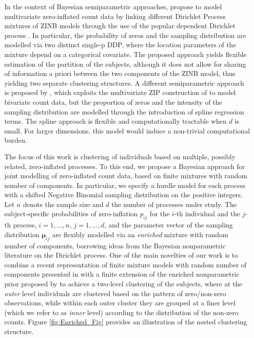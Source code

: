 \documentclass[11pt]{article}
\begin{document}
In the context of Bayesian semiparametric approaches, \cite{shuler2021bayesian} propose to model multivariate zero-inflated count data by linking different Dirichlet Process mixtures of ZINB models through the use of the popular dependent Dirichlet process \citep {maceachern1999dependent}. In particular, the probability of zeros and the sampling distribution are modelled via two distinct single-p DDP, where the location parameters of the mixture depend on a categorical covariate. The proposed approach yields flexible estimation of the partition of the subjects, although it does not allow for sharing of information a priori between the two components of the ZINB model, thus yielding two separate clustering structures. A different semiparametric approach is proposed by \citet{arab2012semiparametric}, which exploits the multivariate ZIP construction of \citet{li1999multivariate} to model bivariate count data, but  the proportion of zeros and the intensity of the sampling distribution are modelled through the introduction of spline regression terms. The spline approach is flexible and computationally tractable when $d$ is small. For larger dimensions, this model would induce a non-trivial computational burden.



The focus of this work is clustering of individuals based on multiple, possibly related, zero-inflated processes. To this end, we propose a Bayesian  approach for joint modelling of zero-inflated count data, based on finite mixtures with random number of components. In particular, we specify a hurdle model for each process with a shifted Negative Binomial sampling distribution on the positive integers. Let $n$ denote the sample size and $d$ the number of processes under study. The subject-specific probabilities of zero-inflation $p_{ij}$ for the $i$-th individual and the $j$-th process, $i=1,\ldots,n$, $j=1,\ldots,d$, and the parameter vector of the sampling distribution $\bm \mu_{ij}$ are flexibly modelled via an {\em enriched} mixture with random number of components, borrowing ideas from the Bayesian nonparametric literature on the Dirichlet process. One of the main novelties of our work is to combine a recent representation of finite mixture models with random number of components presented in \citet{Argiento2022} with a finite extension of the enriched nonparametric prior proposed by \citet{wade2011enriched} to achieve a two-level clustering of the subjects, where at the {\em outer} level individuals are clustered based on the pattern of zero/non-zero observations, while within each outer cluster they are grouped at a finer level (which we refer to as {\em inner} level) according to the distribution of the non-zero counts. Figure \ref{fig:Enriched_Fig} provides an illustration of the nested clustering structure.
\end{document}
